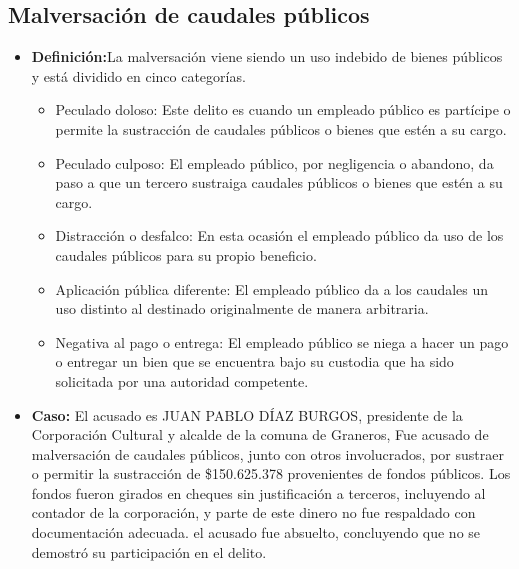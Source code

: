 \documentclass[letter,12pt]{article}
\begin{document}
		\subsection*{Malversación de caudales públicos}
			\begin{itemize}
				\item \textbf{Definición:}La malversación viene siendo un uso indebido de bienes públicos y está dividido en cinco categorías. 
				\begin{itemize}
					\item Peculado doloso: Este delito es cuando un empleado público es partícipe o permite la sustracción de caudales públicos o bienes que estén a su cargo.
					\item  Peculado culposo: El empleado público, por negligencia o abandono, da paso a que un tercero sustraiga caudales públicos o bienes que estén a su cargo.
					\item  Distracción o desfalco: En esta ocasión el empleado público da uso de los caudales públicos para su propio beneficio.
					\item  Aplicación pública diferente: El empleado público da a los caudales un uso distinto al destinado originalmente de manera arbitraria.
					\item Negativa al pago o entrega: El empleado público se niega a hacer un pago o entregar un bien que se encuentra bajo su custodia que ha sido solicitada por una autoridad competente.
				\end{itemize} 
				\item \textbf{Caso:} El acusado es JUAN PABLO DÍAZ BURGOS, presidente de la Corporación Cultural y alcalde de la comuna de Graneros, Fue acusado de malversación de caudales públicos, junto con otros involucrados, por sustraer o permitir la sustracción de \$150.625.378 provenientes de fondos públicos. Los fondos fueron girados en cheques sin justificación a terceros, incluyendo al contador de la corporación, y parte de este dinero no fue respaldado con documentación adecuada. el acusado fue absuelto, concluyendo que no se demostró su participación en el delito.
			\end{itemize}
\end{document}

